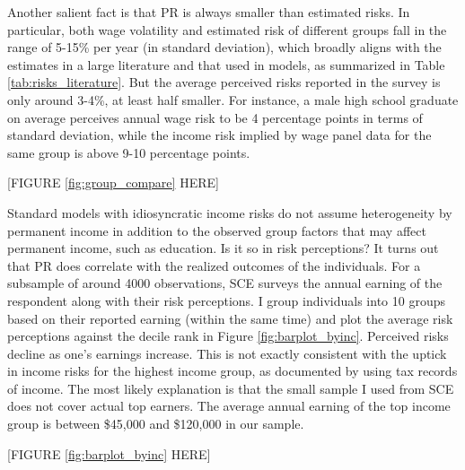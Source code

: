Another salient fact is that PR is always smaller than estimated risks. In particular, both wage volatility and estimated risk of different groups fall in the range of 5-15\% per year (in standard deviation), which broadly aligns with the estimates in a large literature and that used in models, as summarized in Table \ref{tab:risks_literature}. But the average perceived risks reported in the survey is only around 3-4\%, at least half smaller. For instance, a male high school graduate on average perceives annual wage risk to be 4 percentage points in terms of standard deviation, while the income risk implied by wage panel data for the same group is above 9-10 percentage points. 


\begin{center}
 [FIGURE \ref{fig:group_compare} HERE]
 \end{center}
 
 
Standard models with idiosyncratic income risks do not assume heterogeneity by permanent income in addition to the observed group factors that may affect permanent income, such as education. Is it so in risk perceptions? It turns out that PR does correlate with the realized outcomes of the individuals. For a subsample of around 4000 observations, SCE surveys the annual earning of the respondent along with their risk perceptions. I group individuals into 10 groups based on their reported earning (within the same time) and plot the average risk perceptions against the decile rank in Figure \ref{fig:barplot_byinc}. Perceived risks decline as one's earnings increase.  This is not exactly consistent with the uptick in income risks for the highest income group, as documented by \cite{bloom2018great} using tax records of income. The most likely explanation is that the small sample I used from SCE does not cover actual top earners. The average annual earning of the top income group is between \$45,000 and \$120,000 in our sample.  

\begin{center}
 [FIGURE \ref{fig:barplot_byinc} HERE]
\end{center}

